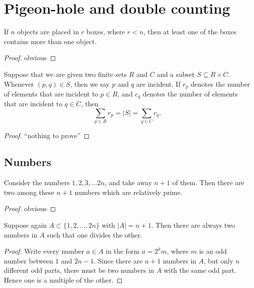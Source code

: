 \chapter{Pigeon-hole and double counting}
\label{chapter28}
\begin{theorem}
  \label{pigeon_hole_principle}
  If $n$ objects are placed in $r$ boxes, where $r < n$, then at least one of the boxes contains
  more than one object.
\end{theorem}
\begin{proof}
  \leanok
  obvious
\end{proof}

\begin{theorem}
  \label{double_counting}
  Suppose that we are given two finite sets $R$ and $C$ and a subset $S \subseteq R \times C$.
  Whenever $(p, q) \in S$, then we say $p$ and $q$ are incident.
  If $r_p$ denotes the number of elements that are incident to $p \in R$, and $c_q$
  denotes the number of elements that are incident to $q \in C$, then
  \[
  \sum_{p \in R} r_p = |S| = \sum_{q \in C} c_q. \tag{3}
  \]
\end{theorem}
\begin{proof}
  ``nothing to prove''
\end{proof}

\section{Numbers}
\begin{theorem}[Claim]
  \label{ch28claim1}
  Consider the numbers $1, 2, 3, \dots 2n$, and take away $n + 1$
  of them. Then there are two among these $n + 1$ numbers which are
  relatively prime.
\end{theorem}
\begin{proof}
  obvious
\end{proof}

\begin{theorem}[Claim]
  \label{ch28claim2}
  Suppose again $A\subset\{1, 2, \dots, 2n\}$ with $|A| = n + 1$. Then
  there are always two numbers in $A$ such that one divides the other.
\end{theorem}
\begin{proof}
  Write every number $a \in A$ in the form $a = 2^k m$, where $m$ is an odd number between $1$
  and $2n - 1$. Since there are $n + 1$ numbers in $A$, but only $n$ different odd parts, there must
  be two numbers in $A$ with the same odd part. Hence one is a multiple of the other.
\end{proof}

